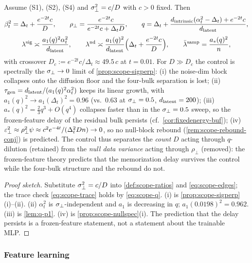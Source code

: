 \begin{proposition}[$\signoise^2=c/D$; sketched]\label{prop:scope-control}
Assume (S1), (S2), (S4) and $\signoise^2=c/D$ with $c>0$ fixed. Then
\begin{equation}\label{eq:scope-ctrl}
\beta_t^2=\Delta_t+\frac{e^{-2t}c}{D},\qquad \rho_\perp=\frac{e^{-2t}c}{e^{-2t}c+\Delta_tD},\qquad q=\Delta_t+\frac{d_{\mathrm{intrinsic}}(\alpha_t^2-\Delta_t)+e^{-2t}c}{d_{\mathrm{latent}}},
\end{equation}
\begin{equation}\label{eq:scope-ctrl-edges}
\lambda^{\rm sig}\asymp\frac{a_1(q)^2\alpha_t^2}{d_{\mathrm{latent}}},\qquad
\lambda^{\rm nd}\asymp\frac{a_1(q)^2}{d_{\mathrm{latent}}}\Big(\Delta_t+\frac{e^{-2t}c}{D}\Big),\qquad
\bar\lambda^{\rm samp}=\frac{a_*(q)^2}{n},
\end{equation}
with crossover $D_c:=e^{-2t}c/\Delta_t\approx49.5\,c$ at $t=0.01$. For $D\gg D_c$ the control is spectrally the $\sigma_{\perp}\to0$ limit of \cref{prop:scope-sigperp}: (i) the noise-dim block collapses onto the diffusion floor and the four-bulk separation is lost; (ii) $\tau_{\mathrm{gen}}=d_{\mathrm{latent}}/(a_1(q)^2\alpha_t^2)$ keeps its linear growth, with $a_1(q)^2\to a_1(\Delta_t)^2=0.96$ (vs.\ $0.63$ at $\sigma_{\perp}=0.5$, $d_{\mathrm{latent}}=200$); (iii) $a_*(q)^2=\tfrac23q^3+O(q^4)$ collapses faster than in the $\sigma_{\perp}=0.5$ sweep, so the frozen-feature delay of the residual bulk persists (cf.\ \cref{cor:fixedenergy-buf}); (iv) $\varepsilon_\perp^2\approx\rho_\perp^2\psi\approx c^2e^{-4t}/(\Delta_t^2Dn)\to0$, so no null-block rebound (\cref{rem:scope-rebound-conj}) is predicted. The control thus separates the \emph{count} $D$ acting through $q$-dilution (retained) from the \emph{null data variance} acting through $\rho_\perp$ (removed): the frozen-feature theory predicts that the memorization delay survives the control while the four-bulk structure and the rebound do not.
\end{proposition}
\begin{proof}[Proof sketch]
Substitute $\signoise^2=c/D$ into \cref{def:scope-ratios} and \eqref{eq:scope-edges}; the trace check \eqref{eq:scope-trace} holds by \eqref{eq:scope-q}. (i) is \cref{prop:scope-sigperp}(i)--(ii). (ii) $\alpha_t^2$ is $\sigma_{\perp}$-independent and $a_1$ is decreasing in $q$; $a_1(0.0198)^2=0.962$. (iii) is \cref{lem:q-p1}. (iv) is \cref{prop:scope-nullspec}(i). The prediction that the delay persists is a frozen-feature statement, not a statement about the trainable MLP.
\end{proof}

\subsubsection{Feature learning}

